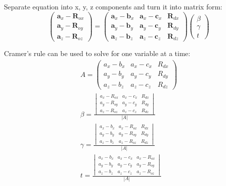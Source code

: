 \documentclass[12pt]{article}
\begin{document}
Separate equation into x, y, z components and turn it into matrix
form:
\[
    \begin{pmatrix}
        \bm a_x - \bm R_{ox}\\
        \bm a_y - \bm R_{oy}\\
        \bm a_z - \bm R_{oz}
    \end{pmatrix}
    =
    \begin{pmatrix}
        \bm a_x - \bm b_x & \bm a_x - \bm c_x & \bm R_{dx}\\
        \bm a_y - \bm b_y & \bm a_y - \bm c_y & \bm R_{dy}\\
        \bm a_z - \bm b_z & \bm a_z - \bm c_z & \bm R_{dz}
    \end{pmatrix}
    \begin{pmatrix}
        \beta\\
        \gamma\\
        t
    \end{pmatrix}
\]

Cramer's rule can be used to solve for one variable at a time:
\begin{gather*}
    A = \begin{pmatrix}
         a_x -  b_x &  a_x -  c_x &  R_{dx}\\
         a_y -  b_y &  a_y -  c_y &  R_{dy}\\
         a_z -  b_z &  a_z -  c_z &  R_{dz}
    \end{pmatrix}\\
    \beta = \frac{
        \begin{vmatrix}
            a_x - R_{ox} & a_x - c_x & R_{dx}\\
            a_y - R_{oy} & a_y - c_y & R_{dy}\\
            a_z - R_{oz} & a_z - c_z & R_{dz}
        \end{vmatrix}
    }{|A|}\\
    \gamma = \frac{
        \begin{vmatrix}
            a_x - b_x & a_x - R_{ox} & R_{dx}\\
            a_y - b_y & a_y - R_{oy} & R_{dy}\\
            a_z - b_z & a_z - R_{oz} & R_{dz}
        \end{vmatrix}
    }{|A|}\\
    t = \frac{
        \begin{vmatrix}
            a_x - b_x & a_x - c_x & a_x - R_{ox}\\
            a_y - b_y & a_y - c_y & a_y - R_{oy}\\
            a_z - b_z & a_z - c_z & a_z - R_{oz}
        \end{vmatrix}
    }{|A|}
\end{gather*}
\end{document}
